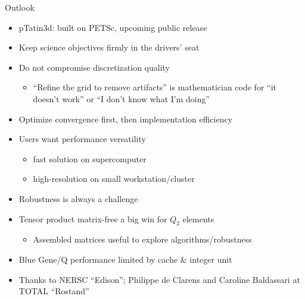 \documentclass{beamer}
\begin{document}
\begin{frame}{Outlook}
  \begin{itemize}
  \item pTatin3d: built on PETSc, upcoming public release
  \item Keep science objectives firmly in the drivers' seat
  \item Do not compromise discretization quality
    \begin{itemize}
    \item ``Refine the grid to remove artifacts'' is mathematician code for ``it doesn't work'' or ``I don't know what I'm doing''
    \end{itemize}
  \item Optimize convergence first, then implementation efficiency
  \item Users want performance versatility
    \begin{itemize}
    \item fast solution on supercomputer
    \item high-resolution on small workstation/cluster
    \end{itemize}
  \item Robustness is always a challenge
  \item Tensor product matrix-free a big win for $Q_2$ elements
    \begin{itemize}
    \item Assembled matrices useful to explore algorithms/robustness
    \end{itemize}
  \item Blue Gene/Q performance limited by cache \& integer unit
  \item Thanks to NERSC ``Edison''; Philippe de Clarens and Caroline Baldassari at TOTAL ``Rostand''
  \end{itemize}
\end{frame}
\end{document}
